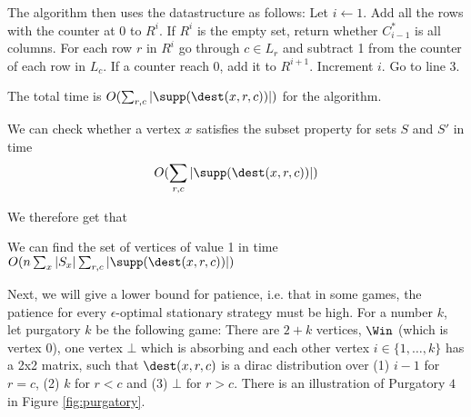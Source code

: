 The algorithm then uses the datastructure as follows:
Let $i\leftarrow 1$.
Add all the rows with the counter at 0 to $R^i$. 
If $R^i$ is the empty set, return whether $C_{i-1}^*$ is all columns.
For each row $r$ in $R^i$ go through $c\in L_r$ and subtract 1 from the counter of each row in $L_c$. If a counter reach 0, add it to $R^{i+1}$.
Increment $i$.
Go to line 3.

The total time is $O(\sum_{r,c}|\supp(\dest(x,r,c))|)$ for the algorithm.

\begin{lemma}
We can check whether a vertex $x$ satisfies the subset property for sets $S$ and $S'$ in time \[O(\sum_{r,c}|\supp(\dest(x,r,c))|)\]
\end{lemma}

We therefore get that \begin{lemma}\label{lem:val1}\label{lemm:find_1_reach}
We can find the set of vertices of value 1 in time $O(n\sum_{x} |S_x|\sum_{r,c}|\supp(\dest(x,r,c))|)$
\end{lemma}

Next, we will give a lower bound for patience, i.e. that in some games, the patience for every $\epsilon$-optimal stationary strategy must be high. 
For a number $k$, let purgatory $k$ be the following game:
There are $2+k$ vertices, $\Win$ (which is vertex 0), one vertex $\bot$ which is absorbing and each other vertex $i\in \{1,\dots, k\}$ has a 2x2 matrix, such that $\dest(x,r,c)$ is a dirac distribution over (1)
$i-1$ for $r=c$, (2) $k$ for $r<c$ and (3) $\bot$ for $r>c$.
There is an illustration of Purgatory $4$ in Figure \ref{fig:purgatory}. 

